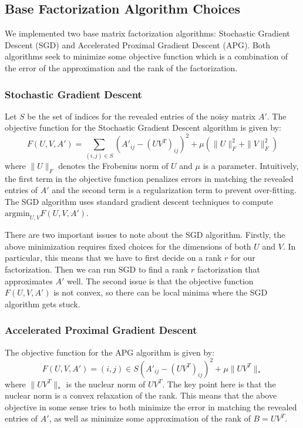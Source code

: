 \subsection{Base Factorization Algorithm Choices}
We implemented two base matrix factorization algorithms: Stochastic Gradient Descent (SGD) and Accelerated Proximal Gradient Descent (APG). Both algorithms seek to minimize some objective function which is a combination of the error of the approximation and the rank of the factorization.
\subsubsection{Stochastic Gradient Descent}
Let $S$ be the set of indices for the revealed entries of the noisy matrix $A'$. The objective function for the Stochastic Gradient Descent algorithm is given by:
\[
F(U,V,A') = \sum_{(i,j)\in S} \left(A'_{ij} - (UV^T)_{ij}\right)^2 + \mu (\| U\|^2_F  + \| V\|^2_F)
\]
where $\|U\|_F$ denotes the Frobenius norm of $U$ and $\mu$ is a parameter. Intuitively, the first term in the objective function penalizes errors in matching the revealed entries of $A'$ and the second term is a regularization term to prevent over-fitting. The SGD algorithm uses standard gradient descent techniques to compute $\mbox{argmin}_{U,V} F(U,V,A')$. 

There are two important issues to note about the SGD algorithm. Firstly, the above minimization requires fixed choices for the dimensions of both $U$ and $V$. In particular, this means that we have to first decide on a rank $r$ for our factorization. Then we can run SGD to find a rank $r$ factorization that approximates $A'$ well. The second issue is that the objective function $F(U,V,A')$ is not convex, so there can be local minima where the SGD algorithm gets stuck.

\subsubsection{Accelerated Proximal Gradient Descent}
The objective function for the APG algorithm is given by:
\[
F(U,V,A') = {(i,j)\in S} \left(A'_{ij} - (UV^T)_{ij}\right)^2 + \mu \| UV^T\|_*
\]
where $\|UV^T\|_*$ is the nuclear norm of $UV^T$. The key point here is that the nuclear norm is a convex relaxation of the rank. This means that the above objective in some sense tries to both minimize the error in matching the revealed entries of $A'$, as well as minimize some approximation of the rank of $B=UV^T$.